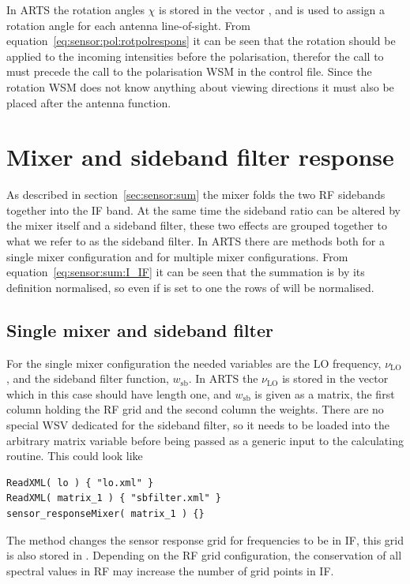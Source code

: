 In ARTS the rotation angles $\chi$ is stored in the vector , and is used to assign a rotation angle for each antenna line-of-sight.  From equation~\ref{eq:sensor:pol:rotpolrespons} it can be seen that the rotation should be applied to the incoming intensities before the polarisation, therefor the call to  must precede the call to the polarisation WSM in the control file. Since the rotation WSM does not know anything about viewing directions it must also be placed after the antenna function. 


\section{Mixer and sideband filter response}
As described in section~\ref{sec:sensor:sum} the mixer folds the two RF sidebands together into the IF band. At the same time the sideband ratio can be altered by the mixer itself and a sideband filter, these two effects are grouped together to what we refer to as the sideband filter. In ARTS there are methods both for a single mixer configuration and for multiple mixer configurations. From equation~\ref{eq:sensor:sum:I_IF} it can be seen that the summation is by its definition normalised, so even if  is set to one the rows of  will be normalised.

\subsection{Single mixer and sideband filter}
For the single mixer configuration the needed variables are the LO frequency, $\nu_\mathrm{LO}$, and the sideband filter function, $w_\mathrm{sb}$. In ARTS the $\nu_\mathrm{LO}$ is stored in the vector  which in this case should have length one, and $w_\mathrm{sb}$ is given as a matrix, the first column holding the RF grid and the second column the weights. There are no special WSV dedicated for the sideband filter, so it needs to be loaded into the arbitrary matrix variable  before being passed as a generic input to the calculating routine. This could look like
\begin{verbatim}
ReadXML( lo ) { "lo.xml" }
ReadXML( matrix_1 ) { "sbfilter.xml" }
sensor_responseMixer( matrix_1 ) {}
\end{verbatim}
The method  changes the sensor response grid for frequencies to be in IF, this grid is also stored in . Depending on the RF grid configuration, the conservation of all spectral values in RF may increase the number of grid points in IF.

